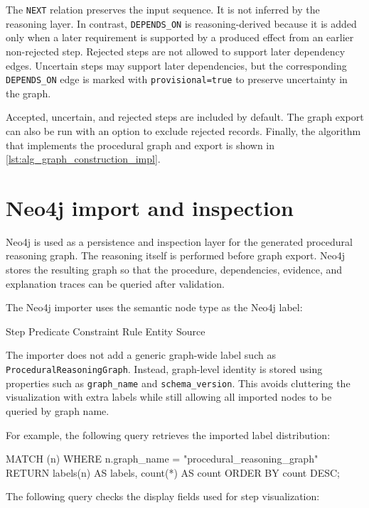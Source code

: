 The \texttt{NEXT} relation preserves the input sequence. It is not inferred by the reasoning layer. In contrast, \texttt{DEPENDS\_ON} is reasoning-derived because it is added only when a later requirement is supported by a produced effect from an earlier non-rejected step. Rejected steps are not allowed to support later dependency edges. Uncertain steps may support later dependencies, but the corresponding \texttt{DEPENDS\_ON} edge is marked with \texttt{provisional=true} to preserve uncertainty in the graph.

Accepted, uncertain, and rejected steps are included by default. The graph export can also be run with an option to exclude rejected records. Finally, the algorithm that implements the procedural graph and export is shown in \cref{lst:alg_graph_construction_impl}.


\section{Neo4j import and inspection}
\label{sec:implementation-neo4j}

Neo4j is used as a persistence and inspection layer for the generated procedural reasoning graph. The reasoning itself is performed before graph export. Neo4j stores the resulting graph so that the procedure, dependencies, evidence, and explanation traces can be queried after validation.

The Neo4j importer uses the semantic node type as the Neo4j label:

\begin{Code}
    Step
    Predicate
    Constraint
    Rule
    Entity
    Source
\end{Code}

The importer does not add a generic graph-wide label such as \texttt{ProceduralReasoningGraph}. Instead, graph-level identity is stored using properties such as \texttt{graph\_name} and \texttt{schema\_version}. This avoids cluttering the visualization with extra labels while still allowing all imported nodes to be queried by graph name.

For example, the following query retrieves the imported label distribution:

\begin{Code}
MATCH (n)
WHERE n.graph_name = "procedural_reasoning_graph"
RETURN labels(n) AS labels, count(*) AS count
ORDER BY count DESC;
\end{Code}

The following query checks the display fields used for step visualization:

